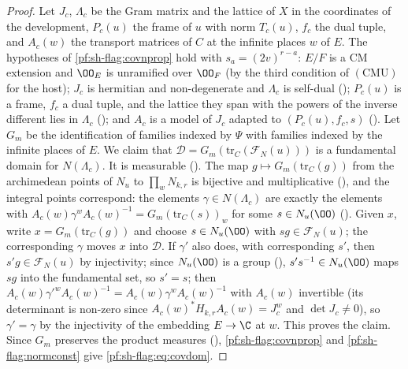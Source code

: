 \begin{proof}
Let $J_c$, $\Lambda_c$ be the Gram matrix and the lattice of $X$ in the coordinates of the development, $P_c(u)$ the frame of
$u$ with norm $T_c(u)$, $f_c$ the dual tuple, and $A_c(w)$ the transport matrices of $C$ at the infinite places $w$ of $E$.
The hypotheses of \cref{pf:sh-flag:covnprop} hold with $s_a=(2v)^{r-a}$: $E/F$ is a CM extension and $\OO_E$ is unramified
over $\OO_F$ (by the third condition of $(\mathrm{CMU})$ for the host); $J_c$ is hermitian and non-degenerate and
$\Lambda_c$ is self-dual (); $P_c(u)$ is a
frame, $f_c$ a dual tuple, and the lattice they span with the powers of the inverse different lies in $\Lambda_c$
(); and $A_c$ is a model of $J_c$ adapted to
$(P_c(u),f_c,s)$ (). Let $G_m$ be the identification of
families indexed by $\Psi$ with families indexed by the infinite places of $E$. We claim that
$\mathcal D=G_m(\mathrm{tr}_C(\mathcal F_N(u)))$ is a fundamental domain for $N(\Lambda_c)$. It is measurable
(). The map $g\mapsto G_m(\mathrm{tr}_C(g))$ from the
archimedean points of $N_u$ to $\prod_wN_{k,r}$ is bijective and multiplicative
(), and the integral points correspond: the
elements $\gamma\in N(\Lambda_c)$ are exactly the elements with $A_c(w)\gamma^wA_c(w)^{-1}=G_m(\mathrm{tr}_C(s))_w$ for some
$s\in N_u(\OO)$ (). Given $x$, write
$x=G_m(\mathrm{tr}_C(g))$ and choose $s\in N_u(\OO)$ with $sg\in\mathcal F_N(u)$; the corresponding $\gamma$ moves $x$ into
$\mathcal D$. If $\gamma'$ also does, with corresponding $s'$, then $s'g\in\mathcal F_N(u)$ by injectivity; since
$N_u(\OO)$ is a group (), $s's^{-1}\in N_u(\OO)$ maps $sg$ into the
fundamental set, so $s'=s$; then $A_c(w)\gamma'^wA_c(w)^{-1}=A_c(w)\gamma^wA_c(w)^{-1}$ with $A_c(w)$ invertible (its
determinant is non-zero since $A_c(w)^*H_{k,r}A_c(w)=J_c^w$ and $\det J_c\ne0$), so $\gamma'=\gamma$ by the injectivity of
the embedding $E\to\C$ at $w$. This proves the claim. Since $G_m$ preserves the product measures
(), \cref{pf:sh-flag:covnprop} and
\cref{pf:sh-flag:normconst} give \eqref{pf:sh-flag:eq:covdom}.
\end{proof}


